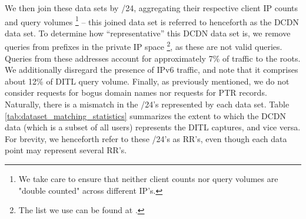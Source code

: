 \documentclass[sigconf,nonacm,10pt]{acmart}
\begin{document}
\begin{table}[]
\centering
{}
\caption{Statistics displaying the extent to which the RR's of users in a large CDN represent RR's seen in the 2018 DITL captures. Also shown is the extent to which RR's of RIPE probes represent the 2018 DITL captures.}
\label{tab:dataset_matching_statistics}
\end{table}

We then join these data sets by /24, aggregating their respective client
IP counts and query volumes
\footnote{We take care to ensure that neither client counts nor query volumes are "double counted" across different IP's.}
-- this joined data set is referred to henceforth as the DCDN data set.
To determine how ``representative'' this DCDN data set is, we remove
queries from prefixes in the private IP space
\footnote{ The list we use can be found at \cite{private_ip_space}.}, as
these are not valid queries. Queries from these addresses account for
approximately 7\% of traffic to the roots. We additionally disregard the
presence of IPv6 traffic, and note that it comprises about 12\% of DITL
query volume. Finally, as previously mentioned, we do not consider
requests for bogus domain names nor requests for PTR records. Naturally,
there is a mismatch in the /24's represented by each data set. Table
\ref{tab:dataset_matching_statistics} summarizes the extent to which the
DCDN data (which is a subset of all users) represents the DITL captures,
and vice versa. For brevity, we henceforth refer to these /24's as RR's,
even though each data point may represent several RR's.
\end{document}
